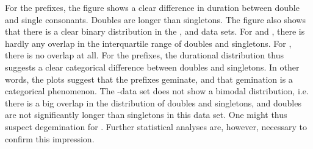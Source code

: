  
For the prefixes, the figure shows a clear difference in duration between double and single consonants. Doubles are longer than singletons. The figure also shows that there is a clear binary distribution in the ,  and data sets.  For  and , there is hardly any overlap in the interquartile range of doubles and singletons. For , there is no overlap at all. For the prefixes, the durational distribution thus suggests a clear categorical difference between doubles and singletons. In other words, the plots suggest that the prefixes geminate, and that gemination is a categorical phenomenon. 
The -data set does not show a bimodal distribution, i.e. there is a big overlap in the distribution of doubles and singletons, and doubles are not significantly longer than singletons in this data set. One might thus suspect degemination for . Further statistical analyses are, however, necessary to confirm this impression.











